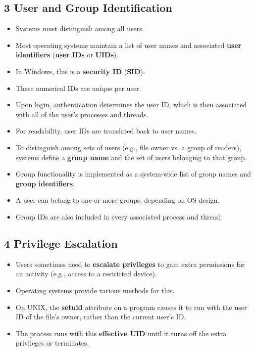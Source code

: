 \documentclass{article}
\begin{document}
\subsection*{3 User and Group Identification}
\begin{itemize}
    \item Systems must distinguish among all users.
    \item Most operating systems maintain a list of user names and associated \textbf{user identifiers} (\textbf{user IDs} or \textbf{UIDs}).
    \item In Windows, this is a \textbf{security ID} (\textbf{SID}).
    \item These numerical IDs are unique per user.
    \item Upon login, authentication determines the user ID, which is then associated with all of the user's processes and threads.
    \item For readability, user IDs are translated back to user names.
    \item To distinguish among sets of users (e.g., file owner vs. a group of readers), systems define a \textbf{group name} and the set of users belonging to that group.
    \item Group functionality is implemented as a system-wide list of group names and \textbf{group identifiers}.
    \item A user can belong to one or more groups, depending on OS design.
    \item Group IDs are also included in every associated process and thread.
\end{itemize}

\subsection*{4 Privilege Escalation}
\begin{itemize}
    \item Users sometimes need to \textbf{escalate privileges} to gain extra permissions for an activity (e.g., access to a restricted device).
    \item Operating systems provide various methods for this.
    \item On UNIX, the \textbf{setuid} attribute on a program causes it to run with the user ID of the file's owner, rather than the current user's ID.
    \item The process runs with this \textbf{effective UID} until it turns off the extra privileges or terminates.
\end{itemize}
\end{document}
